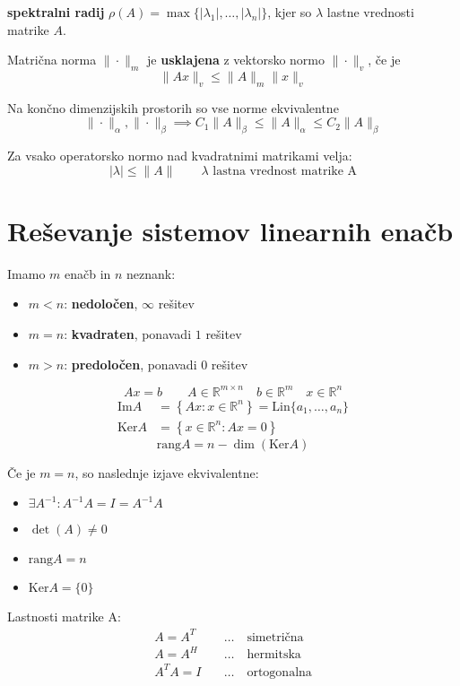 \begin{multicols}{5}
\textbf{spektralni radij} $\rho(A) = \max\{ |\lambda_1|, \dots, |\lambda_n| \}$, kjer so $\lambda$ lastne vrednosti matrike $A$.

Matrična norma $\| \cdot \|_m$ je \textbf{usklajena} z vektorsko normo $\|\cdot \|_v$, če je
\[ \| Ax \|_v \leq \| A \|_m \| x \|_v \]


Na končno dimenzijskih prostorih so vse norme ekvivalentne
\[ \| \cdot \|_\alpha, \| \cdot \|_\beta \implies C_1 \| A \|_\beta \leq \| A \|_\alpha \leq C_2 \| A \|_\beta \]

Za vsako operatorsko normo nad kvadratnimi matrikami velja:
\[ |\lambda | \leq \|A\| \qquad \lambda \text{ lastna vrednost matrike A}\]

\section{Reševanje sistemov linearnih enačb}
Imamo $m$ enačb in $n$ neznank:
\begin{itemize}
	\item $m < n$: \textbf{nedoločen}, $\infty$ rešitev
	\item $m = n$: \textbf{kvadraten}, ponavadi $1$ rešitev
	\item $m > n$: \textbf{predoločen}, ponavadi $0$ rešitev
\end{itemize}

\[ A x = b \qquad A \in \mathbb{R}^{m \times n} \quad b \in \mathbb{R}^m  \quad x \in \mathbb{R}^n\]
\begin{align*}
	\text{Im}A &= \left\{ Ax : x \in \mathbb{R}^n \right\} = \text{Lin}\{a_1, \dots, a_n\} \\
	\text{Ker}A &= \left\{ x \in \mathbb{R}^n : Ax = 0 \right\}
\end{align*}
\[ \text{rang}A = n - \dim (\text{Ker}A)\]

Če je $m=n$, so naslednje izjave ekvivalentne:
\begin{itemize}
	\item $\exists A^{-1}: A^{-1} A = I = A^{-1}A$
	\item $\det(A) \neq 0$
	\item $\text{rang}A = n$
	\item $\text{Ker}A = \{0\}$
\end{itemize}

Lastnosti matrike A:
\begin{align*}
	A = A^T & \quad \dots \quad \text{simetrična} \\
	A = A^H & \quad \dots \quad \text{hermitska} \\
	A^T A = I & \quad \dots \quad \text{ortogonalna}
\end{align*}


\end{multicols}
